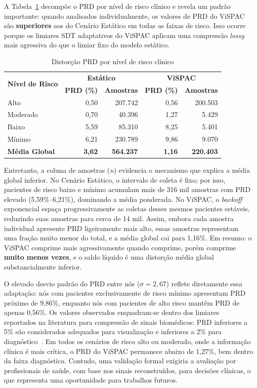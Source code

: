 \documentclass[twoside,english,brazilian]{UNISINOSmonografia}
\begin{document}
A Tabela~\ref{tab:prd_by_risk} decompõe o PRD por nível de risco clínico e revela um padrão importante: quando analisados individualmente, os valores de PRD do ViSPAC são \textbf{superiores} aos do Cenário Estático em todas as faixas de risco. Isso ocorre porque os limiares SDT adaptativos do ViSPAC aplicam uma compressão \textit{lossy} mais agressiva do que o limiar fixo do modelo estático.

\begin{table}[ht]
\centering
\caption{Distorção PRD por nível de risco clínico}
\label{tab:prd_by_risk}
\footnotesize
\begin{tabular}{|l|r r|r r|}
\hline
\multirow{2}{*}{\textbf{Nível de Risco}} & \multicolumn{2}{c|}{\textbf{Estático}} & \multicolumn{2}{c|}{\textbf{ViSPAC}} \\
 & \textbf{PRD (\%)} & \textbf{Amostras} & \textbf{PRD (\%)} & \textbf{Amostras} \\ \hline
Alto    & 0,50 & 207.742 & 0,56 & 200.503 \\
Moderado & 0,70 & 40.396  & 1,27 & 5.429   \\
Baixo   & 5,59 & 85.310  & 8,25 & 5.401   \\
Mínimo  & 6,21 & 230.789 & 9,86 & 9.070   \\ \hline
\textbf{Média Global} & \textbf{3,62} & \textbf{564.237} & \textbf{1,16} & \textbf{220.403} \\ \hline
\end{tabular}
\end{table}

Entretanto, a coluna de amostras (\textit{n}) evidencia o mecanismo que explica a média global inferior. No Cenário Estático, o intervalo de coleta é fixo; por isso, pacientes de risco baixo e mínimo acumulam mais de 316 mil amostras com PRD elevado (5,59\%--6,21\%), dominando a média ponderada. No ViSPAC, o \textit{backoff} exponencial espaça progressivamente as coletas desses mesmos pacientes estáveis, reduzindo suas amostras para cerca de 14 mil. Assim, embora cada amostra individual apresente PRD ligeiramente mais alto, essas amostras representam uma fração muito menor do total, e a média global cai para 1,16\%. Em resumo: o ViSPAC comprime mais agressivamente quando comprime, porém comprime \textbf{muito menos vezes}, e o saldo líquido é uma distorção média global substancialmente inferior.

O elevado desvio padrão do PRD entre nós ($\sigma = 2{,}67$) reflete diretamente essa adaptação: nós com pacientes exclusivamente de risco mínimo apresentam PRD próximo de 9,86\%, enquanto nós com pacientes de alto risco mantêm PRD de apenas 0,56\%. Os valores observados enquadram-se dentro dos limiares reportados na literatura para compressão de sinais biomédicos: PRD inferiores a 5\% são considerados adequados para visualização e inferiores a 2\% para diagnóstico~\cite{Hassan2024}. Em todos os cenários de risco alto ou moderado, onde a informação clínica é mais crítica, o PRD do ViSPAC permanece abaixo de 1,27\%, bem dentro da faixa diagnóstica. Contudo, uma validação formal exigiria a avaliação por profissionais de saúde, com base nos sinais reconstruídos, para decisões clínicas, o que representa uma oportunidade para trabalhos futuros.
\end{document}
